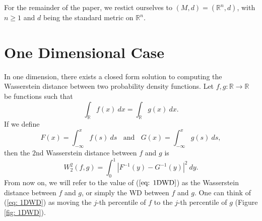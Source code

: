 \documentclass[10pt]{article}
\begin{document}
\noindent For the remainder of the paper, we restict ourselves to $(M,d) = (\mathbb{R}^n, d)$, with $n \geq 1$ and $d$ being the standard metric on $\mathbb{R}^n$. 

\section{One Dimensional Case} \label{sec: OneD}
In one dimension, there exists a closed form solution to computing the Wasserstein distance between two probability density functions. Let $f, g: \mathbb{R} \rightarrow \mathbb{R}$ be functions such that
\begin{equation}
\int_{\mathbb{R}} f(x) \ dx = \int_{\mathbb{R}} g(x) \ dx.
\end{equation}
If we define
\begin{equation}
F(x) = \int_{- \infty}^x f(s) \ ds \ \ \ \ \text{and} \ \ \ \ G(x) = \int_{- \infty}^x g(s) \ ds,
\end{equation}
then the $2$nd Wasserstein distance between $f$ and $g$ is
\begin{equation}
W_2^2(f, g) = {\int_{0}^1 |F^{-1}(y) - G^{-1}(y)|^2 \ dy}.
\label{eq: 1DWD}
\end{equation}
From now on, we will refer to the value of ($\ref{eq: 1DWD}$) as the Wasserstein distance between $f$ and $g$, or simply the WD between $f$ and $g$.
One can think of (\ref{eq: 1DWD}) as moving the $j$-th percentile of $f$ to the $j$-th percentile of $g$ (Figure \ref{fig: 1DWD}).
\end{document}
